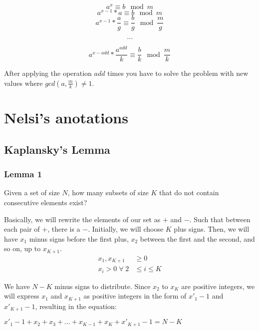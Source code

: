         $$a^x \equiv b \mod{m}$$
        $$a^{x-1}*a \equiv b \mod{m}$$
        $$a^{x-1}*\frac{a}{g} \equiv \frac{b}{g} \mod{\frac{m}{g}}$$
        
        $$\dots$$
        
        $$a^{x-add}*\frac{a^{add}}{k} \equiv \frac{b}{k} \mod{\frac{m}{k}}$$

        After applying the operation $add$ times you have to solve the problem with new values where $gcd(a,\frac{m}{k}) \neq 1$.

            
    \section{Nelsi's anotations}
        \subsection{Kaplansky's Lemma} 
            \subsubsection{Lemma 1}
                \tab Given a set of size $N$, how many subsets of size $K$ that do not contain consecutive elements exist?
                
                Basically, we will rewrite the elements of our set as $+$ and $-$. Such that between each pair of $+$, there is a $-$. Initially, we will choose $K$ plus signs. Then, we will have $x_1$ minus signs before the first plus, $x_2$ between the first and the second, and so on, up to $x_{\scriptscriptstyle K+1}$.
                \begin{align*}
                    x_1, x_{\scriptscriptstyle K+1} &\ge 0\\
                    x_i > 0 \; \forall \; 2 &\le i \le K 
                \end{align*}
        
                We have $N-K$ minus signs to distribute. Since $x_2$ to $x_{\scriptscriptstyle K}$ are positive integers, we will express $x_1$ and $x_{\scriptscriptstyle K+1}$ as positive integers in the form of $x'_1-1$ and $x'_{\scriptscriptstyle K+1}-1$, resulting in the equation:
                
                
                $x'_1 - 1 + x_2 + x_3 + ... + x_{\scriptscriptstyle K-1} + x_{\scriptscriptstyle K} + x'_{\scriptscriptstyle K+1}-1 = N-K$
        

